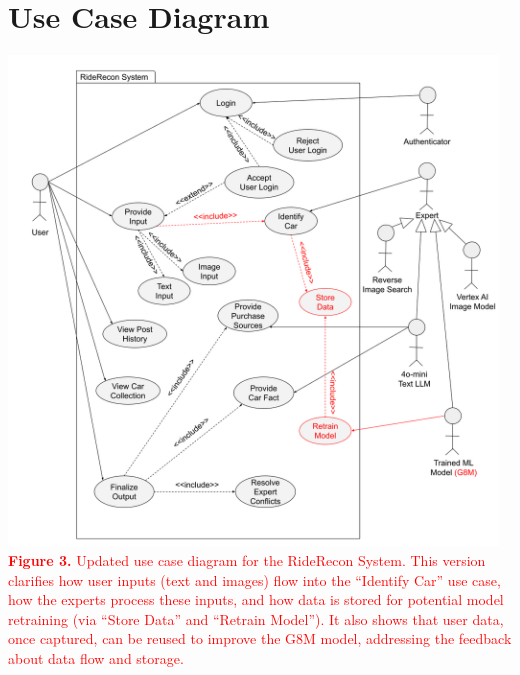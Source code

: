 \documentclass[]{article}
\begin{document}
\section{Use Case Diagram}
\label{sec:use_case_diagram}

\begin{center}
\includegraphics[height=13cm]{images/Use Case Diagram D1_improved.png} \\
\textcolor{red}{\textbf{Figure 3. } Updated use case diagram for the RideRecon System. This version clarifies how user inputs (text and images) flow into the “Identify Car” use case, how the experts process these inputs, and how data is stored for potential model retraining (via “Store Data” and “Retrain Model”). It also shows that user data, once captured, can be reused to improve the G8M model, addressing the feedback about data flow and storage.}
\end{center}
\end{document}
